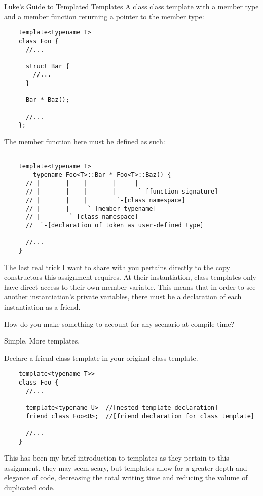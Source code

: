 \begin{section}{Luke's Guide to Templated Templates}
 \indent A class class template with a member type and a member function returning a
 pointer to the member type:

 \begin{verbatim}
    template<typename T>
    class Foo {
      //...

      struct Bar {
        //...
      }

      Bar * Baz();

      //...
    };
 \end{verbatim}

 The member function here must be defined as such:
 \begin{verbatim}

    template<typename T>
		typename Foo<T>::Bar * Foo<T>::Baz() {
      // |       |    |       |     |
      // |       |    |       |      `-[function signature]
      // |       |    |        `-[class namespace]
      // |       |     `-[member typename]
      // |        `-[class namespace]
      //  `-[declaration of token as user-defined type]

      //...
    }
 \end{verbatim}

 \pagebreak
 \indent The last real trick I want to share with you pertains directly to the copy
 constructors this assignment requires. At their instantiation, class templates
 only have direct access to their own  member variable. This
 means that in order to see another instantiation's private variables, there
 must be a declaration of each instantiation as a friend.

 \begin{displayquote}
	 How do you make something to account for any scenario at compile time?

	 Simple. More templates.

	 Declare a friend class template in your original class template.

	 \begin{verbatim}
    template<typename T>>
    class Foo {
      //...

      template<typename U>  //[nested template declaration]
      friend class Foo<U>;  //[friend declaration for class template]

      //...
    }
	 \end{verbatim}
 \end{displayquote}

 \indent This has been my brief introduction to templates as they pertain to this
 assignment. they may seem scary, but templates allow for a greater depth and
 elegance of code, decreasing the total writing time and reducing the volume of
 duplicated code.

\end{section}
